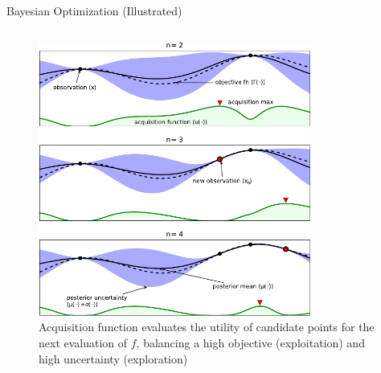 \begin{frame}{Bayesian Optimization (Illustrated)}
  \begin{columns}
    \begin{figure}
      \centering
      \includegraphics[width=0.8\textwidth]{figures/serving-bo-illustration.pdf}
      \caption{Acquisition function evaluates the utility of candidate points
        for the next evaluation of $f$, balancing a high objective
        (exploitation) and high uncertainty
        (exploration)~\cite{shahriari2016taking}}
    \end{figure}


\end{columns}
\end{frame}
